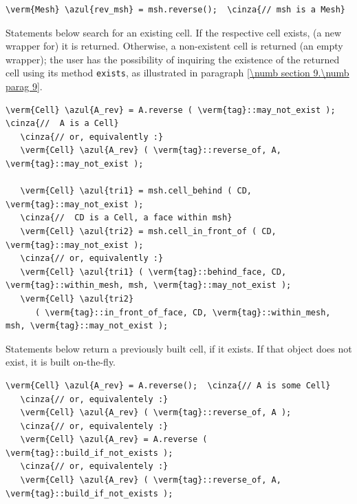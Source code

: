 \begin{Verbatim}[commandchars=\\\{\},formatcom=\small\tt,
   baselinestretch=0.94,framesep=2mm                      ]
   \verm{Mesh} \azul{rev_msh} = msh.reverse();  \cinza{// msh is a Mesh}
\end{Verbatim}

Statements below search for an existing cell.
If the respective cell exists, (a new wrapper for) it is returned.
Otherwise, a non-existent cell is returned
(an empty wrapper); the user has the possibility of inquiring the existence
of the returned cell using its method {\small\tt exists}, as illustrated in paragraph
\ref{\numb section 9.\numb parag 9}.

\begin{Verbatim}[commandchars=\\\{\},formatcom=\small\tt,
   baselinestretch=0.94,framesep=2mm                      ]
   \verm{Cell} \azul{A_rev} = A.reverse ( \verm{tag}::may_not_exist );  \cinza{//  A is a Cell}
   \cinza{// or, equivalently :}
   \verm{Cell} \azul{A_rev} ( \verm{tag}::reverse_of, A, \verm{tag}::may_not_exist );
   
   \verm{Cell} \azul{tri1} = msh.cell_behind ( CD, \verm{tag}::may_not_exist );
   \cinza{//  CD is a Cell, a face within msh}
   \verm{Cell} \azul{tri2} = msh.cell_in_front_of ( CD, \verm{tag}::may_not_exist );
   \cinza{// or, equivalently :}
   \verm{Cell} \azul{tri1} ( \verm{tag}::behind_face, CD, \verm{tag}::within_mesh, msh, \verm{tag}::may_not_exist );
   \verm{Cell} \azul{tri2}
      ( \verm{tag}::in_front_of_face, CD, \verm{tag}::within_mesh, msh, \verm{tag}::may_not_exist );
\end{Verbatim}

Statements below return a previously built cell, if it exists.
If that object does not exist, it is built on-the-fly.

\begin{Verbatim}[commandchars=\\\{\},formatcom=\small\tt,
   baselinestretch=0.94,framesep=2mm                      ]
   \verm{Cell} \azul{A_rev} = A.reverse();  \cinza{// A is some Cell}
   \cinza{// or, equivalentely :}
   \verm{Cell} \azul{A_rev} ( \verm{tag}::reverse_of, A );
   \cinza{// or, equivalentely :}
   \verm{Cell} \azul{A_rev} = A.reverse ( \verm{tag}::build_if_not_exists );
   \cinza{// or, equivalentely :}
   \verm{Cell} \azul{A_rev} ( \verm{tag}::reverse_of, A, \verm{tag}::build_if_not_exists );
\end{Verbatim}

